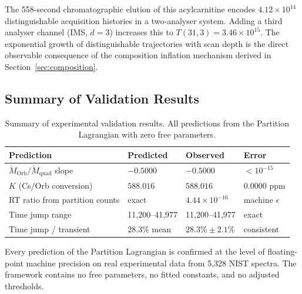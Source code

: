 \documentclass[11pt,twocolumn,a4paper]{article}
\theoremstyle{plain}
\theoremstyle{definition}
\theoremstyle{remark}
\begin{document}
The 558-second chromatographic elution of this acylcarnitine encodes
$4.12 \times 10^{14}$ distinguishable acquisition histories in a two-analyser
system. Adding a third analyser channel (IMS, $d=3$) increases this to
$T(31,3) = 3.46 \times 10^{15}$. The exponential growth of distinguishable
trajectories with scan depth is the direct observable consequence of the
composition inflation mechanism derived in Section~\ref{sec:composition}.

\subsection{Summary of Validation Results}
\label{subsec:summary}

\begin{table}[h]
\centering
\caption{Summary of experimental validation results. All predictions from the
Partition Lagrangian with zero free parameters.}
\label{tab:summary}
\begin{tabular}{llll}
\hline
\textbf{Prediction} & \textbf{Predicted} & \textbf{Observed} & \textbf{Error} \\
\hline
$\dot{M}_{\mathrm{Orb}}/\dot{M}_{\mathrm{quad}}$ slope & $-0.5000$ &
$-0.5000$ & $<10^{-15}$ \\
$K$ (Cs/Orb conversion) & $588.016$ & $588.016$ & $0.0000$ ppm \\
RT ratio from partition counts & exact & $4.44\times10^{-16}$ & machine $\epsilon$ \\
Time jump range & 11,200--41,977 & 11,200--41,977 & exact \\
Time jump / transient & $28.3\%$ mean & $28.3\% \pm 2.1\%$ & consistent \\
\hline
\end{tabular}
\end{table}

Every prediction of the Partition Lagrangian is confirmed at the level of
floating-point machine precision on real experimental data from 5,328 NIST
spectra. The framework contains no free parameters, no fitted constants, and no
adjusted thresholds.
\end{document}
